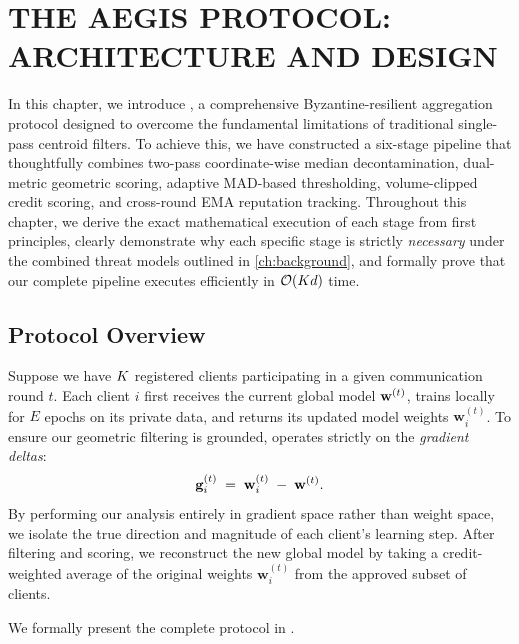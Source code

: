 \documentclass[../main.tex]{subfiles}
\begin{document}
\chapter{THE AEGIS PROTOCOL: ARCHITECTURE AND DESIGN}
\label{ch:methodology}

In this chapter, we introduce \aegis{}, a comprehensive Byzantine-resilient aggregation protocol designed to overcome the fundamental limitations of traditional single-pass centroid filters. To achieve this, we have constructed a six-stage pipeline that thoughtfully combines two-pass coordinate-wise median decontamination, dual-metric geometric scoring, adaptive MAD-based thresholding, volume-clipped credit scoring, and cross-round EMA reputation tracking. Throughout this chapter, we derive the exact mathematical execution of each stage from first principles, clearly demonstrate why each specific stage is strictly \emph{necessary} under the combined threat models outlined in \cref{ch:background}, and formally prove that our complete pipeline executes efficiently in $\mathcal{O}\!\left(Kd\right)$ time.

\section{Protocol Overview}
\label{sec:aegis_overview}

Suppose we have $K$ registered clients participating in a given communication round $t$. Each client $i$ first receives the current global model $\mathbf{w}^{(t)}$, trains locally for $E$ epochs on its private data, and returns its updated model weights $\mathbf{w}_i^{(t)}$. To ensure our geometric filtering is grounded, \aegis{} operates strictly on the \emph{gradient deltas}:
\begin{equation}
    \mathbf{g}_{i}^{(t)} \;=\; \mathbf{w}_i^{(t)} \;-\; \mathbf{w}^{(t)}.
    \label{eq:delta_def}
\end{equation}
By performing our analysis entirely in gradient space rather than weight space, we isolate the true direction and magnitude of each client's learning step. After filtering and scoring, we reconstruct the new global model by taking a credit-weighted average of the original weights $\mathbf{w}_i^{(t)}$ from the approved subset of clients.

We formally present the complete \aegis{} protocol in .
\end{document}
